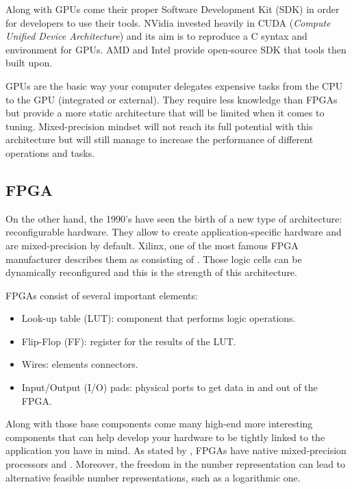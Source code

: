 Along with GPUs come their proper Software Development Kit (SDK) in order for developers to use their tools. NVidia invested heavily in CUDA (\emph{Compute Unified Device Architecture}) \cite{CUDA} and its aim is to reproduce a C syntax and environment for GPUs. AMD and Intel provide open-source SDK that tools then built upon.

GPUs are the basic way your computer delegates expensive tasks from the CPU to the GPU (integrated or external). They require less knowledge than FPGAs but provide a more static architecture that will be limited when it comes to tuning. Mixed-precision mindset will not reach its full potential with this architecture but will still manage to increase the performance of different operations and tasks.


\subsection{FPGA}

On the other hand, the 1990's have seen the birth of a new type of architecture: reconfigurable hardware. They allow to create application-specific hardware and are mixed-precision by default. Xilinx, one of the most famous FPGA manufacturer describes them as consisting of  \cite{Xilinx2017}. Those logic cells can be dynamically reconfigured and this is the strength of this architecture.

FPGAs consist of several important elements:
\begin{itemize}
  \item Look-up table (LUT): component that performs logic operations.
  \item Flip-Flop (FF): register  for the results of the LUT.
  \item Wires: elements connectors.
  \item Input/Output (I/O) pads: physical ports to get data in and out of the FPGA.
\end{itemize}

Along with those base components come many high-end more interesting components that can help develop your hardware to be tightly linked to the application you have in mind. As stated by \cite{Goddeke2007}, FPGAs have native mixed-precision processors and . Moreover, the freedom in the number representation can lead to alternative feasible number representations, such as a logarithmic one.


